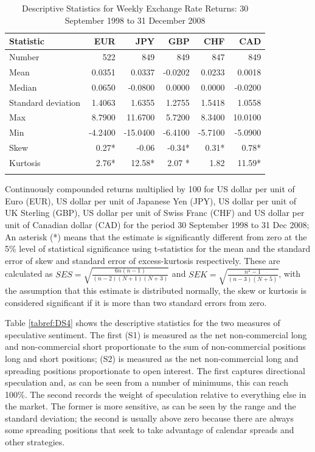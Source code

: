 \documentclass[12pt, a4paper, oneside]{article} %
\begin{document}
 \begin{table}[t]
\begin{threeparttable}
\caption{Descriptive Statistics for Weekly Exchange Rate Returns: 30 September 1998 to 31 December 2008}
\begin{tabular}{l | r r  r r r }
  \hline
 Statistic &  EUR & JPY & GBP & CHF & CAD  \\
  \hline
Number & 522 &  849 & 849 & 847 & 849 \\
Mean & 0.0351 & 0.0337 & -0.0202 & 0.0233 & 0.0018\\
Median & 0.0650 & -0.0800 & 0.0000 & 0.0000 & -0.0200\\
Standard deviation  & 1.4063 & 1.6355 & 1.2755 & 1.5418 & 1.0558\\
Max & 8.7900 & 11.6700 & 5.7200 & 8.3400 & 10.0100\\
Min & -4.2400 & -15.0400 & -6.4100 & -5.7100 & -5.0900\\
Skew  & 0.27* & -0.06 & -0.34* & 0.31* & 0.78*\\
Kurtosis & 2.76*& 12.58* & 2.07 * & 1.82 & 11.59*\\
\hline
 \label{tabref:DS3}
\end{tabular}
\begin{tablenotes}
\small
\item Continuously compounded returns multiplied by 100 for US dollar per unit of Euro (EUR), US dollar per unit of Japanese Yen (JPY), US dollar per unit of UK Sterling (GBP), US dollar per unit of Swiss Franc (CHF) and US dollar per unit of Canadian dollar (CAD) for the period 30 September 1998 to 31 Dec 2008;     An asterisk (*) means that the estimate is significantly different from zero at the 5\% level of statistical significance using t-statistics for the mean and the standard error of skew and standard error of excess-kurtosis respectively.  These are calculated as $SES = \sqrt{\frac{6n(n-1)}{(n-2)(N+1)(N+3)}}$ and $SEK = \sqrt{\frac{n^2-1}{(n-3)(N+5)}}$, with the assumption that this estimate is distributed normally, the skew or kurtosis is considered significant if it is more than two standard errors from zero.
\end{tablenotes}
\end{threeparttable}
\end{table}

Table \ref{tabref:DS4} shows the descriptive statistics for the two measures of speculative sentiment.  The first (S1) is measured as the net non-commercial long and non-commercial short proportionate to the sum of non-commercial positions long and short positions; (S2) is measured as the net non-commercial long and spreading positions proportionate to open interest.  The first captures directional speculation and, as can be seen from a number of minimums, this can reach 100\%.  The second records the weight of speculation relative to everything else in the market.  The former is more sensitive, as can be seen by the range and the standard deviation; the second is usually above zero because there are always some spreading positions that seek to take advantage of calendar spreads and other strategies.    
\end{document}
